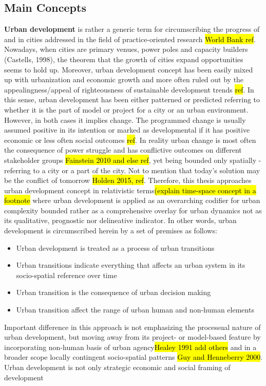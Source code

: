 \documentclass[11pt]{report}
\begin{document}
\subsection{Main Concepts}
\textbf{Urban development} is rather a generic term for circumscribing the progress of and in cities addressed in the   field of practice-oriented research \hl{World Bank ref}. Nowadays, when cities are primary venues, power poles and capacity builders (Castells, 1998), the theorem that the growth of cities expand opportunities seems to hold up. Moreover, urban development concept has been easily mixed up with urbanization and economic growth and more often ruled out by the appealingness/appeal of righteousness of sustainable development trends \hl{ref}.  In this sense, urban development has been either patterned or predicted referring to whether it is the part of model or project for a city or an urban environment. However, in both cases it implies change. The programmed change is usually assumed positive in its intention or marked as developmental if it has positive economic or less often social outcomes \hl{ref}. In reality urban change is most often the consequence of power struggle and has conflictive outcomes on different stakeholder groups \hl{Fainstein 2010 and else ref}, yet being bounded only spatially - referring to a city or a part of the city. Not to mention that today's solution may be the conflict of tomorrow \hl{Holden 2015, ref}.
Therefore, this thesis approaches urban development concept in relativistic terms\hl{(explain time-space concept in a footnote} where urban development is applied as an overarching codifier for urban complexity bounded rather as a comprehensive overlay for urban dynamics not as its qualitative, prognostic nor delineative indicator. In other words,  urban development is circumscribed herein by a set of premises as follows: 
\begin{itemize}
\item Urban development is treated as a process of urban transitions
\item Urban transitions indicate everything that affects an urban system in its socio-spatial reference over time
\item Urban transition is the consequence of urban decision making
\item Urban transition affect the range of urban human and non-human elements
\end {itemize}
Important difference in this approach is not emphasizing the processual nature of urban development, but moving away from its project- or model-based feature by incorporating non-human basis of urban agency\hl{Healey 1991 add others} and in a broader scope locally contingent socio-spatial patterns \hl{Guy and Henneberry 2000}. Urban development is not only strategic economic and social framing of development
\end{document}

